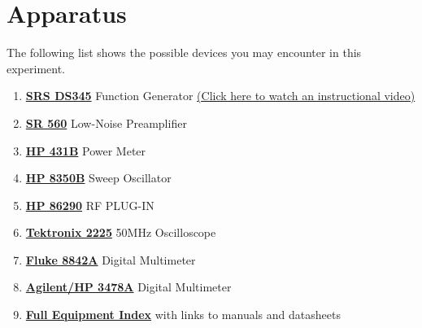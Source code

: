 \documentclass{../lab}
\begin{document}
\section{Apparatus}
The following list shows the possible devices you may encounter in this experiment.%

\begin{enumerate}
    \item \href{https://berkeley-physics111b.github.io/assets/pdf/oldwebsitestructure/General_Equipment/SRS%20DS345_Manual.pdf}{\textbf{SRS DS345}} Function Generator \href{https://youtu.be/PrM8DHFOFS0}{(Click here to watch an instructional video)}

    \item \href{https://berkeley-physics111b.github.io/assets/pdf/oldwebsitestructure/General_Equipment/SRS%20SR560_Manual.pdf}{\textbf{SR 560}} Low-Noise Preamplifier

    \item \href{https://berkeley-physics111b.github.io/assets/pdf/oldwebsitestructure/JOS/Equipment/HP%20431B_Power%20Meter_Manual.pdf}{\textbf{HP 431B}} Power Meter

    \item \href{https://berkeley-physics111b.github.io/assets/pdf/oldwebsitestructure/JOS/Equipment/HP%208350B_Sweep%20Oscillator_Manual.pdf}{\textbf{HP 8350B}} Sweep Oscillator

    \item \href{https://berkeley-physics111b.github.io/assets/pdf/oldwebsitestructure/JOS/Equipment/HP%2086290B_RF%20Plug-in_Manual.pdf}{\textbf{HP 86290}} RF PLUG-IN
    
    \item \href{https://berkeley-physics111b.github.io/assets/pdf/oldwebsitestructure/General_Equipment/Tektronix%202225_Manual.pdf}{\textbf{Tektronix 2225}} 50MHz Oscilloscope
    
    \item \href{https://berkeley-physics111b.github.io/assets/pdf/oldwebsitestructure/General_Equipment/Fluke%208842A_Multimeter_Manual.pdf}{\textbf{Fluke 8842A}} Digital Multimeter
    
    \item \href{https://berkeley-physics111b.github.io/assets/pdf/oldwebsitestructure/General_Equipment/HP%203478A_Manual.pdf}{\textbf{Agilent/HP 3478A}} Digital Multimeter

    \item\href{https://berkeley-physics111b.github.io/assets/pdf/oldwebsitestructure/JOS/Equipment/00-JOS_Equipment%20List_Index.pdf}{\textbf{Full Equipment Index}} with links to manuals and datasheets

\end{enumerate}
\end{document}
